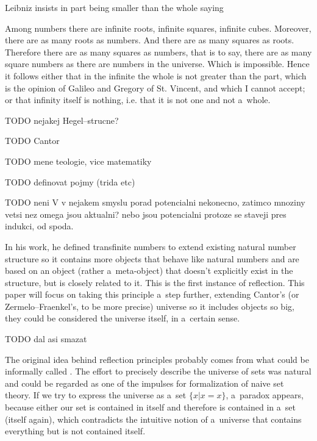 \documentclass[12pt,a4paper]{article}
\begin{document}
Leibniz insists in part being smaller than the whole saying
\begin{displayquote}
Among numbers there are infinite roots, infinite squares, infinite cubes. Moreover, there are
as many roots as numbers. And there are as many squares as roots. Therefore there are as
many squares as numbers, that is to say, there are as many square numbers as there are
numbers in the universe. Which is impossible. Hence it follows either that in the infinite the
whole is not greater than the part, which is the opinion of Galileo and Gregory of St.
Vincent, and which I cannot accept; or that infinity itself is nothing, i.e. that it is not one and
not a~whole. %
\end{displayquote}

TODO  nejakej Hegel--strucne?

TODO Cantor

TODO mene teologie, vice matematiky

TODO definovat pojmy (trida etc)

TODO neni V v nejakem smyslu porad potencialni nekonecno, zatimco mnoziny vetsi nez omega jsou aktualni? nebo jsou potencialni protoze se staveji pres indukci, od spoda.

In his work, he defined transfinite numbers to extend existing natural number %
structure so it contains more objects that behave like natural numbers and are based on an object (rather a~meta-object) that doesn't explicitly exist in the structure, but is closely related to it. This is the first instance of reflection. 
This paper will focus on taking this principle a~step further, extending Cantor's (or Zermelo–Fraenkel's, to be more precise) universe so it includes objects so big, they could be considered the universe itself, in a~certain sense. %


TODO dal asi smazat


The original idea behind reflection principles probably comes from what could be informally called .
The effort to precisely describe the universe of sets was natural and could be regarded as one of the impulses for formalization of naive set theory.
If we try to express the universe as a~set $\{x  |  x = x\}$, a~paradox appears, because either our set is contained in itself and therefore is contained in a~set (itself again), which contradicts the intuitive notion of a~universe that contains everything but is not contained itself.
\end{document}
